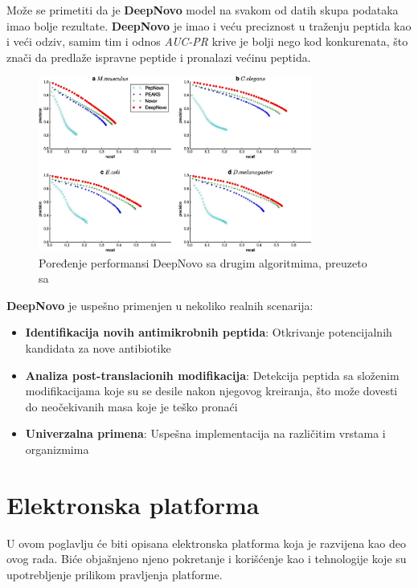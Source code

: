 \documentclass[12pt,oneside]{memoir}
\begin{document}
Može se primetiti da je \textbf{DeepNovo} model na svakom od datih skupa podataka imao bolje rezultate. \textbf{DeepNovo} je imao i veću preciznost u traženju peptida kao i veći odziv, samim tim i odnos \emph{AUC-PR} krive je bolji nego kod konkurenata, što znači da predlaže ispravne peptide i pronalazi većinu peptida.

\begin{figure}[h]
\centering
\includegraphics[width=0.8\textwidth]{images/deep_novo_comparison.jpeg}
\caption{Poređenje performansi DeepNovo sa drugim algoritmima, preuzeto sa \cite{deepnovo}}
\label{fig:performanse}
\end{figure}

\textbf{DeepNovo} je uspešno primenjen u nekoliko realnih scenarija:

\begin{itemize}
\item \textbf{Identifikacija novih antimikrobnih peptida}: Otkrivanje potencijalnih kandidata za nove antibiotike
\item \textbf{Analiza post-translacionih modifikacija}: Detekcija peptida sa složenim modifikacijama koje su se desile nakon njegovog kreiranja, što može dovesti do neočekivanih masa koje je teško pronaći
\item \textbf{Univerzalna primena}: Uspešna implementacija na različitim vrstama i organizmima
\end{itemize}


\chapter{Elektronska platforma}

U ovom poglavlju će biti opisana elektronska platforma koja je razvijena kao deo ovog rada. Biće objašnjeno njeno pokretanje i korišćenje kao i tehnologije koje su upotrebljenje prilikom pravljenja platforme.
\end{document}
